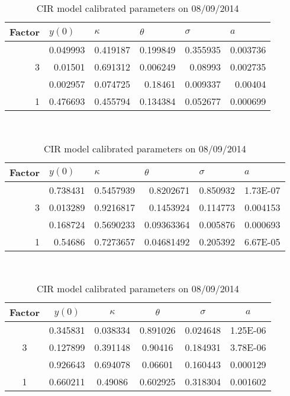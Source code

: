 \documentclass[12pt,a4paper]{article}
\theoremstyle{plain}
\numberwithin{equation}{section}
\begin{document}
\begin{table}[t]

  \centering
    \begin{tabular}{|r|rrrrr|}
   \hline
    \multicolumn{1}{|l|}{Factor} & \multicolumn{1}{l}{$y(0)$} & \multicolumn{1}{l}{$\kappa$} & \multicolumn{1}{l}{$\theta$} & \multicolumn{1}{l}{$\sigma$} & \multicolumn{1}{l|}{$a$} \\
     \hline
    \multirow{3}[2]{*}{3} & 0.049993 & 0.419187 & 0.199849 & 0.355935 & 0.003736 \\
          & 0.01501 & 0.691312 & 0.006249 & 0.08993 & 0.002735 \\
          & 0.002957 & 0.074725 & 0.18461 & 0.009337 & 0.00404 \\
     \hline
    1     & 0.476693 & 0.455794 & 0.134384 & 0.052677 & 0.000699 \\
    \hline
    \end{tabular}\\[1ex]

    \caption{CIR model calibrated parameters on 01/01/2013}\label{OISPar:20130101}%

   \begin{tabular}{|r|rrrrr|}
   \hline
    \multicolumn{1}{|l|}{Factor} & \multicolumn{1}{l}{$y(0)$} & \multicolumn{1}{l}{$\kappa$} & \multicolumn{1}{l}{$\theta$} & \multicolumn{1}{l}{$\sigma$} & \multicolumn{1}{l|}{$a$} \\
     \hline
    \multirow{3}[2]{*}{3} & 0.738431 & 0.5457939 & 0.8202671 & 0.850932 & 1.73E-07 \\
    3     & 0.013289 & 0.9216817 & 0.1453924 & 0.114773 & 0.004153 \\
          & 0.168724 & 0.5690233 & 0.09363364 & 0.005876 & 0.000693 \\
          \hline
    1     & 0.54686 & 0.7273657 & 0.04681492 & 0.205392 & 6.67E-05 \\

    \hline
    \end{tabular}\\[1ex]

    \caption{CIR model calibrated parameters on 08/09/2014}\label{OISPar:20140908}%

    \begin{tabular}{|c|ccccc|}
     \hline
    Factor & $y(0)$    & $\kappa$ & $\theta$ & $\sigma$ & $a$ \\
     \hline
    \multirow{3}[2]{*}{3} & 0.345831 & 0.038334 & 0.891026 & 0.024648 & 1.25E-06 \\
          & 0.127899 & 0.391148 & 0.90416 & 0.184931 & 3.78E-06 \\
          & 0.926643 & 0.694078 & 0.06601 & 0.160443 & 0.000129 \\
   \hline
    1     & 0.660211 & 0.49086 & 0.602925 & 0.318304 & 0.001602 \\
     \hline
    \end{tabular}%


\end{table}
\end{document}
